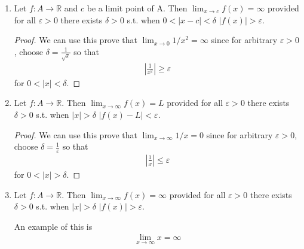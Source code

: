 \begin{enumerate}[label=(\alph*)]
    \item 
    \begin{definition}
        Let $f: A \rightarrow \mathbb{R}$ and $c$ be a limit point of 
        A. Then $\lim_{x\rightarrow c} f(x)= \infty$ provided for all
        $\varepsilon>0$ there exists $\delta>0$ s.t. when $0<|x-c|<\delta$
        $|f(x)|>\varepsilon$.
    \end{definition}

    \begin{proof}
        We can use this prove that $\lim_{x\rightarrow 0}1/x^2=\infty$
        since for arbitrary $\varepsilon>0$, choose $\delta = \frac{1}{\sqrt{\varepsilon}}$
        so that 
        \begin{align*}
            |\frac{1}{x^2}| \geq \varepsilon
        \end{align*}
        for $0<|x|<\delta$.
    \end{proof}
    
    \item 
    \begin{definition}
        Let $f: A \rightarrow \mathbb{R}$.
         Then $\lim_{x\rightarrow \infty} f(x)= L$ provided for all
        $\varepsilon>0$ there exists $\delta>0$ s.t. when $|x|>\delta$
        $|f(x)-L|<\varepsilon$.
    \end{definition}

    \begin{proof}
        We can use this prove that $\lim_{x\rightarrow \infty}1/x=0$
        since for arbitrary $\varepsilon>0$, choose $\delta = \frac{1}{\varepsilon}$
        so that 
        \begin{align*}
            |\frac{1}{x}| \leq \varepsilon
        \end{align*}
        for $0<|x|>\delta$.
    \end{proof}

    \item
    \begin{definition}
        Let $f: A \rightarrow \mathbb{R}$.
         Then $\lim_{x\rightarrow \infty} f(x)= \infty$ provided for all
        $\varepsilon>0$ there exists $\delta>0$ s.t. when $|x|>\delta$
        $|f(x)|>\varepsilon$.
    \end{definition}

    An example of this is
    \begin{align*}
        \lim_{x\rightarrow \infty} x = \infty
    \end{align*}
\end{enumerate}

